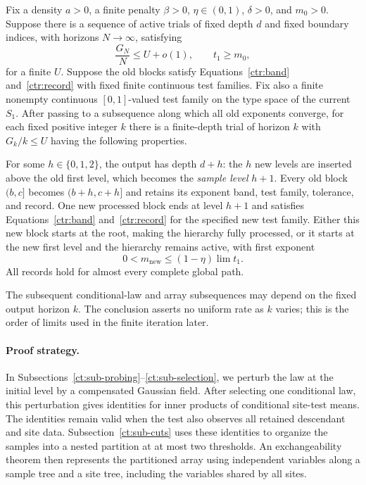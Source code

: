 \begin{lemma}
\label{ct:transition}
Fix a density $a>0$, a finite penalty $\beta>0$, $\eta\in(0,1)$,
$\delta>0$, and $m_0>0$. Suppose there is a
sequence of active trials of fixed depth $d$ and fixed boundary indices,
with horizons $N\to\infty$, satisfying
\begin{equation}
 \frac{G_N}{N}\le U+o(1),\qquad t_1\ge m_0,
 \label{ct:input-bound}
\end{equation}
for a finite $U$. Suppose the old blocks satisfy
Equations~\eqref{ctr:band} and~\eqref{ctr:record} with fixed finite
continuous test families. Fix also a finite nonempty continuous
$[0,1]$-valued test family on the type space of the current $S_1$.
After passing to a subsequence along which all old exponents
converge, for each fixed positive integer $k$ there is a finite-depth
trial of horizon $k$ with $G_k/k\le U$ having the following
properties.

For some $h\in\{0,1,2\}$, the output has depth $d+h$: the $h$ new
levels are inserted above the old first level, which becomes the
\emph{sample level} $h+1$.  Every old block $(b,c]$ becomes
$(b+h,c+h]$ and retains its exponent band, test family, tolerance, and record.
One new processed block ends at level $h+1$ and satisfies
Equations~\eqref{ctr:band} and~\eqref{ctr:record} for the specified
new test family. Either this new block starts at the root, making
the hierarchy fully processed, or it starts at the new first
level and the hierarchy remains active, with first exponent
\begin{equation}
 0<m_{\mathrm{new}}\le(1-\eta)\lim t_1.
 \label{ct:progress}
\end{equation}
All records hold for almost every complete global path.
\end{lemma}

The subsequent conditional-law and array subsequences may depend on the
fixed output horizon $k$.  The conclusion asserts no uniform rate as $k$
varies; this is the order of limits used in the finite iteration later.


\paragraph{Proof strategy.}
In Subsections~\ref{ct:sub-probing}--\ref{ct:sub-selection}, we perturb
the law at the initial level by a compensated Gaussian field.  After selecting
one conditional law, this perturbation
gives identities for inner products of conditional site-test means.
The identities remain valid when the test also observes all retained
descendant and site data.  Subsection~\ref{ct:sub-cuts} uses these identities
to organize the samples into a nested
partition at at most two thresholds.  An exchangeability theorem then
represents the partitioned array using independent variables along a
sample tree and a site tree, including the variables shared by all sites.

